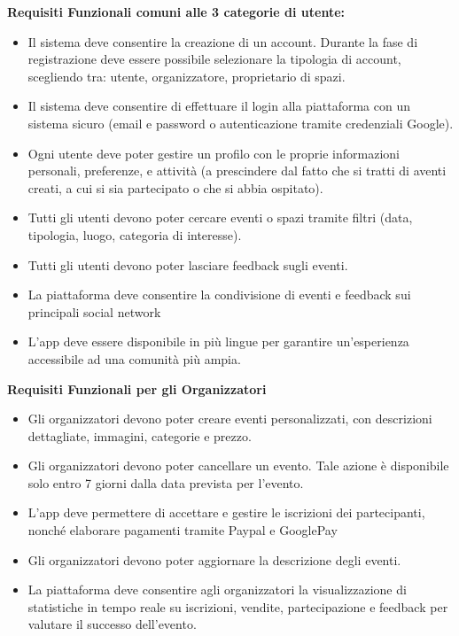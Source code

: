 \documentclass[9pt]{extarticle}
\begin{document}
\textbf{Requisiti Funzionali comuni alle 3 categorie di utente:}
\begin{itemize}
	\item \FR Il sistema deve consentire la creazione di un account. Durante la fase di registrazione deve essere possibile selezionare la tipologia di account, scegliendo tra: utente, organizzatore, proprietario di spazi.
	 \item \FR Il sistema deve consentire di effettuare il login alla piattaforma con un sistema sicuro (email e password o autenticazione tramite credenziali Google). 
	\item \FR Ogni utente deve poter gestire un profilo con le proprie informazioni personali, preferenze, e attività (a prescindere dal fatto che si tratti di aventi creati, a cui si sia partecipato o che si abbia ospitato).
	\item \FR Tutti gli utenti devono poter cercare eventi o spazi tramite filtri (data, tipologia, luogo, categoria di interesse).
	\item \FR Tutti gli utenti devono poter lasciare feedback sugli eventi.
	\item \FR La piattaforma deve consentire la condivisione di eventi e feedback sui principali social network
	\item \FR L'app deve essere disponibile in più lingue per garantire un'esperienza accessibile ad una comunità più ampia.
\end{itemize}



\textbf{Requisiti Funzionali per gli Organizzatori}
\begin{itemize}
	\item \FR Gli organizzatori devono poter creare eventi personalizzati, con descrizioni dettagliate, immagini, categorie e prezzo.
	\item \FR Gli organizzatori devono poter cancellare un evento. Tale azione è disponibile solo entro 7 giorni dalla data prevista per l'evento.
	\item \FR L’app deve permettere di accettare e gestire le iscrizioni dei partecipanti, nonché elaborare pagamenti tramite Paypal e GooglePay
	\item \FR Gli organizzatori devono poter aggiornare la descrizione degli eventi.
	\item \FR La piattaforma deve consentire agli organizzatori la visualizzazione di statistiche in tempo reale su iscrizioni, vendite, partecipazione e feedback per valutare il successo dell’evento.
\end{itemize}
\end{document}

